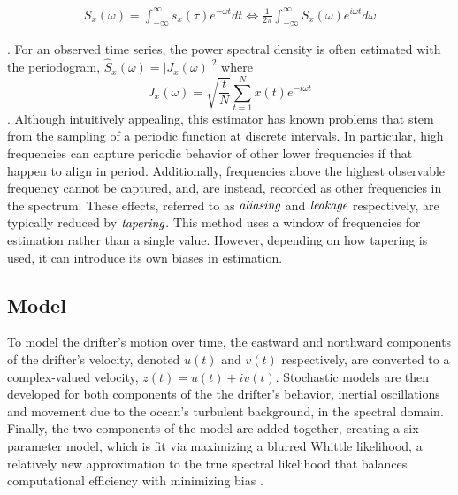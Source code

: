 \documentclass{stat572Style}
\begin{document}
\begin{align*}
S_{x}(\omega) = \int_{-\infty}^{\infty}s_{x}(\tau) e^{-\omega t}dt  \Longleftrightarrow \frac{1}{2\pi} \int_{-\infty}^{\infty}S_{x}(\omega) e^{i \omega t} d\omega 
\end{align*}

\noindent \citep{Sykulski2013}. For an observed time series, the power spectral density is often estimated with the periodogram, $\hat{S}_{x}(\omega) = |J_{x}(\omega)|^{2}$ where 
\begin{equation}
J_{x}(\omega) = \sqrt{\frac{t}{N}} \sum_{t=1}^{N} x(t) e^{-i \omega t}
\end{equation}
\citep{Sykulski2013}. Although intuitively appealing, this estimator has known problems that stem from the sampling of a periodic function at discrete intervals. In particular,  high frequencies can  capture periodic behavior of other lower frequencies if that happen to align in period. Additionally, frequencies above the highest observable frequency cannot be captured, and, are instead, recorded as other frequencies in the spectrum.  These effects, referred to as $\textbf{\it{aliasing}}$ and $\textbf{\it{leakage}}$ respectively,  are typically reduced by $\textbf{\it{tapering}}$. This method uses  a window of frequencies for estimation rather than a single value. However, depending on how tapering is used, it can introduce its own  biases in estimation.  


\subsection{Model}
 To model the drifter's motion over time, the eastward and northward components of the drifter's velocity, denoted $u(t)$ and $v(t)$ respectively, are converted to a complex-valued velocity, $z(t) = u(t) + iv(t)$. Stochastic models are then developed for both components of the the drifter's behavior, inertial oscillations and movement due to the ocean's turbulent background,  in the spectral domain. Finally, the two components of the model are added together, creating a six-parameter model, which is fit via maximizing a blurred Whittle likelihood, a relatively new approximation to the true spectral likelihood that balances computational efficiency with minimizing bias \citep{Sykulski2013}. 
 
\end{document}
